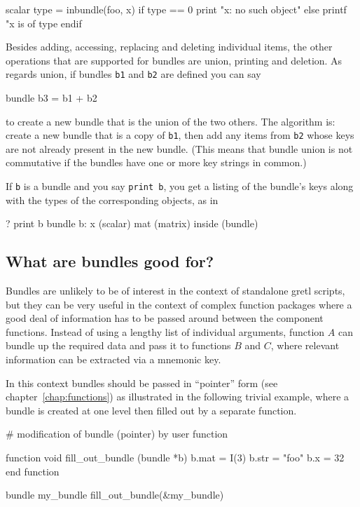 \begin{code}
scalar type = inbundle(foo, x)
if type == 0
  print "x: no such object"
else
  printf "x is of type %
endif
\end{code}

Besides adding, accessing, replacing and deleting individual items,
the other operations that are supported for bundles are union,
printing and deletion. As regards union, if bundles \texttt{b1} and
\texttt{b2} are defined you can say

\begin{code}
bundle b3 = b1 + b2
\end{code}

to create a new bundle that is the union of the two others. The
algorithm is: create a new bundle that is a copy of \texttt{b1}, then
add any items from \texttt{b2} whose keys are not already present in
the new bundle. (This means that bundle union is not commutative if
the bundles have one or more key strings in common.)

If \texttt{b} is a bundle and you say \texttt{print b}, you get a
listing of the bundle's keys along with the types of the corresponding
objects, as in

\begin{code}
? print b
bundle b:
 x (scalar)
 mat (matrix)
 inside (bundle)
\end{code}

\subsection{What are bundles good for?}

Bundles are unlikely to be of interest in the context of standalone
gretl scripts, but they can be very useful in the context of
complex function packages where a good deal of information has to be
passed around between the component functions. Instead of using a
lengthy list of individual arguments, function $A$ can bundle up the
required data and pass it to functions $B$ and $C$, where relevant
information can be extracted via a mnemonic key.

In this context bundles should be passed in ``pointer'' form
(see chapter~\ref{chap:functions}) as illustrated in the following
trivial example, where a bundle is created at one level then filled
out by a separate function.

\begin{code}
# modification of bundle (pointer) by user function

function void fill_out_bundle (bundle *b)
  b.mat =  I(3)
  b.str = "foo"
  b.x = 32
end function

bundle my_bundle 
fill_out_bundle(&my_bundle)
\end{code}

